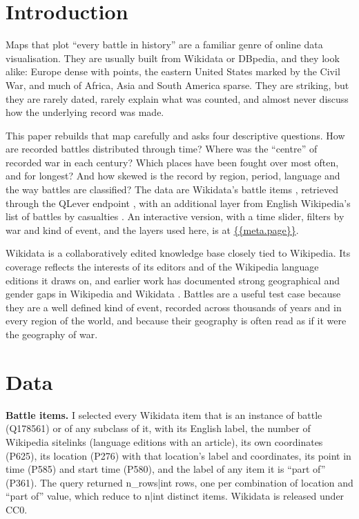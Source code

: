 \documentclass[11pt,a4paper]{article}
\begin{document}
\section{Introduction}
Maps that plot ``every battle in history'' are a familiar genre of online data visualisation. They are usually built from Wikidata or DBpedia, and they look alike: Europe dense with points, the eastern United States marked by the Civil War, and much of Africa, Asia and South America sparse. They are striking, but they are rarely dated, rarely explain what was counted, and almost never discuss how the underlying record was made.

This paper rebuilds that map carefully and asks four descriptive questions. How are recorded battles distributed through time? Where was the ``centre'' of recorded war in each century? Which places have been fought over most often, and for longest? And how skewed is the record by region, period, language and the way battles are classified? The data are Wikidata's battle items \citep{wikidata}, retrieved through the QLever endpoint \citep{qlever}, with an additional layer from English Wikipedia's list of battles by casualties \citep{wp_cas}. An interactive version, with a time slider, filters by war and kind of event, and the layers used here, is at \url{{{meta.page}}}.

Wikidata is a collaboratively edited knowledge base closely tied to Wikipedia. Its coverage reflects the interests of its editors and of the Wikipedia language editions it draws on, and earlier work has documented strong geographical and gender gaps in Wikipedia and Wikidata \citep{graham,redi}. Battles are a useful test case because they are a well defined kind of event, recorded across thousands of years and in every region of the world, and because their geography is often read as if it were the geography of war.

\section{Data}
\textbf{Battle items.} I selected every Wikidata item that is an instance of battle (Q178561) or of any subclass of it, with its English label, the number of Wikipedia sitelinks (language editions with an article), its own coordinates (P625), its location (P276) with that location's label and coordinates, its point in time (P585) and start time (P580), and the label of any item it is ``part of'' (P361). The query returned {{n_rows|int}} rows, one per combination of location and ``part of'' value, which reduce to {{n|int}} distinct items. Wikidata is released under CC0.
\end{document}
